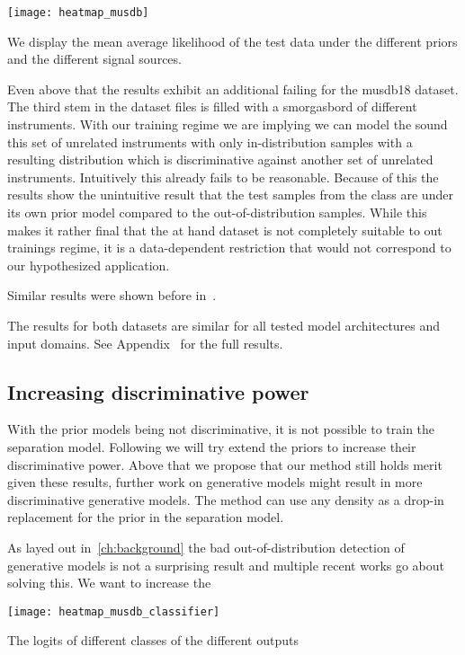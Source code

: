 \begin{marginfigure}
    \texttt{[image: heatmap\_musdb]}%
    \caption{We display the mean average likelihood of the test data under the different priors and the different signal sources.}%
    \label{fig:heatmap_musdb}
\end{marginfigure}

Even above that the results exhibit an additional failing for the musdb18 dataset. The third stem in the dataset files  is filled with a smorgasbord of different instruments. With our training regime we are implying we can model the sound this set of unrelated instruments with only in-distribution samples with a resulting distribution which is discriminative against another set of unrelated instruments. Intuitively this already fails to be reasonable. Because of this the results show the unintuitive result that the test samples from the  class are  under its own prior model compared to the out-of-distribution samples. While this makes it rather final that the at hand dataset is not completely suitable to out trainings regime, it is a data-dependent restriction that would not correspond to our hypothesized application.

Similar results were shown before in~.

The results for both datasets are similar for all tested model architectures and input domains. See Appendix~ for the full results.

\subsection{Increasing discriminative power}
With the prior models being not discriminative, it is not possible to train the separation model. Following we will try extend the priors to increase their discriminative power. Above that we propose that our method still holds merit given these results, further work on generative models might result in more discriminative generative models. The method can use any density as a drop-in replacement for the prior in the separation model.

As layed out in~\ref{ch:background} the bad out-of-distribution detection of generative models is not a surprising result and multiple recent works go about solving this. We want to increase the

\begin{marginfigure}
    \texttt{[image: heatmap\_musdb\_classifier]}
    \caption{The logits of different classes of the different outputs}%
    \label{fig:heatmap_musdb_classifier}
\end{marginfigure}

